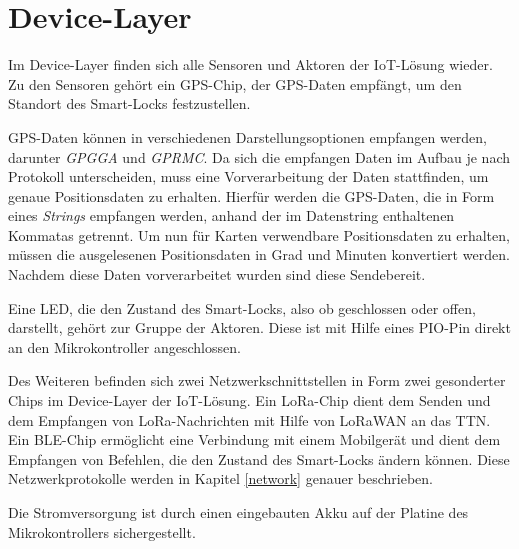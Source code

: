 
\section{Device-Layer}

Im Device-Layer finden sich alle Sensoren und Aktoren der \ac{IoT}-Lösung wieder. 
Zu den Sensoren gehört ein \ac{GPS}-Chip, der \ac{GPS}-Daten empfängt, um den Standort des Smart-Locks festzustellen. 

\ac{GPS}-Daten können in verschiedenen Darstellungsoptionen empfangen werden, darunter \emph{GPGGA} und \emph{GPRMC}. Da sich die empfangen Daten im Aufbau 
je nach Protokoll unterscheiden, muss eine Vorverarbeitung der Daten stattfinden, um genaue Positionsdaten zu erhalten.
Hierfür werden die \ac{GPS}-Daten, die in Form eines \emph{Strings} empfangen werden, anhand der im Datenstring enthaltenen Kommatas getrennt.
Um nun für Karten verwendbare Positionsdaten zu erhalten, müssen die ausgelesenen Positionsdaten in Grad und Minuten konvertiert werden. Nachdem diese 
Daten vorverarbeitet wurden sind diese Sendebereit.

Eine \ac{LED}, die den Zustand des Smart-Locks, also ob geschlossen oder offen, darstellt, gehört zur Gruppe der Aktoren. Diese ist mit Hilfe eines \ac{PIO}-Pin direkt an den Mikrokontroller angeschlossen.

Des Weiteren befinden sich zwei Netzwerkschnittstellen in Form zwei gesonderter Chips im Device-Layer der \ac{IoT}-Lösung. Ein \ac{LoRa}-Chip dient dem Senden und dem Empfangen von 
\ac{LoRa}-Nachrichten mit Hilfe von \ac{LoRaWAN} an das \ac{TTN}. Ein \ac{BLE}-Chip ermöglicht eine Verbindung mit einem Mobilgerät und dient dem Empfangen von Befehlen, 
die den Zustand des Smart-Locks ändern können. Diese Netzwerkprotokolle werden in Kapitel \ref{network} genauer beschrieben.

Die Stromversorgung ist durch einen eingebauten Akku auf der Platine des Mikrokontrollers sichergestellt.
